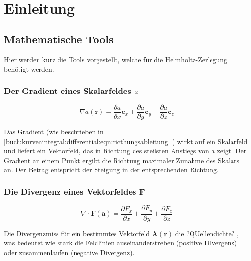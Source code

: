 %
%
%
%
\section{Einleitung\label{helmholtz:section:teil0}}

\subsection{Mathematische Tools}

Hier werden kurz die Tools vorgestellt, welche für die Helmholtz-Zerlegung benötigt werden.

\subsubsection{Der Gradient eines Skalarfeldes $a$}
\begin{equation}
\nabla a(\mathbf{r}) = \frac{\partial a}{\partial x}\mathbf{e}_x + \frac{\partial a}{\partial y}\mathbf{e}_y + \frac{\partial a}{\partial z}\mathbf{e}_z
\end{equation}

Das Gradient (wie beschrieben in  \eqref{buch:kurvenintegral:differential:eqn:ricthungsableitung} ) wirkt auf ein Skalarfeld und liefert ein Vektorfeld, das in Richtung des steilsten Anstiegs von $a$ zeigt. Der Gradient an einem Punkt ergibt die Richtung maximaler Zunahme des Skalars an. Der Betrag entspricht der Steigung in der entsprechenden Richtung. \newline



\subsubsection{Die Divergenz eines Vektorfeldes $\mathbf{F}$}
\begin{equation}
\nabla \cdot \mathbf{F}(\mathbf{a}) = \frac{\partial F_x}{\partial x} + \frac{\partial F_y}{\partial y} + \frac{\partial F_z}{\partial z}
\end{equation}

Die Divergenzmiss für ein bestimmtes Vektorfeld $\mathbf{A}(\mathbf{r})$ die ?QUellendichte? , was bedeutet wie stark die Feldlinien auseinanderstreben (positive DIvergenz) oder zusammenlaufen (negative Divergenz). \newline

